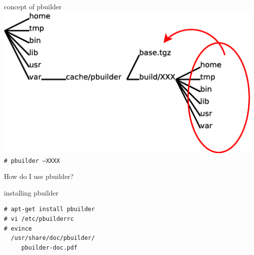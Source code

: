 \documentclass[dvipdfm,17pt,times]{beamer}
\newcommand{\emtext}[1]{
\begin{frame}{}
 
{\Huge #1
}
\end{frame}
}
\begin{document}
\begin{frame}{concept of pbuilder}
 \includegraphics[width=1\hsize]{chroot-pbuilder.eps}\\
\texttt{\# pbuilder --XXXX}
\end{frame}

\emtext{How do I use pbuilder?}

\begin{frame}[containsverbatim]{installing pbuilder}
\begin{verbatim}
# apt-get install pbuilder
# vi /etc/pbuilderrc
# evince 
  /usr/share/doc/pbuilder/
     pbuilder-doc.pdf	
\end{verbatim}
\end{frame}
\end{document}
